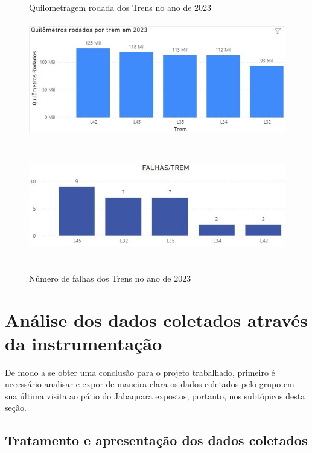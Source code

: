 \documentclass[acronym,symbols,table]{fei}
\begin{document}
\begin{figure}[!htb]
	\centering
	\begin{minipage}{0.4\textwidth}
		\caption{Quilometragem rodada dos Trens no ano de 2023}
		\includegraphics[width=\linewidth, height=5cm]{Imagens/Quilometros.jpeg}
		\label{fig:quilometros}
	\end{minipage}\hfill
	\begin{minipage}{0.5\textwidth}
		\caption{Número de falhas dos Trens no ano de 2023}
		\includegraphics[width=\linewidth, height=5cm]{Imagens/erros.jpeg}
		\label{fig:falhas}
	\end{minipage}
\end{figure}

\newpage

\section{Análise dos dados coletados através da instrumentação}

De modo a se obter uma conclusão para o projeto trabalhado, primeiro é necessário analisar e expor de maneira clara os dados coletados pelo grupo em sua última visita ao pátio do Jabaquara expostos, portanto, nos subtópicos desta seção.

\subsection{Tratamento e apresentação dos dados coletados}
\end{document}
